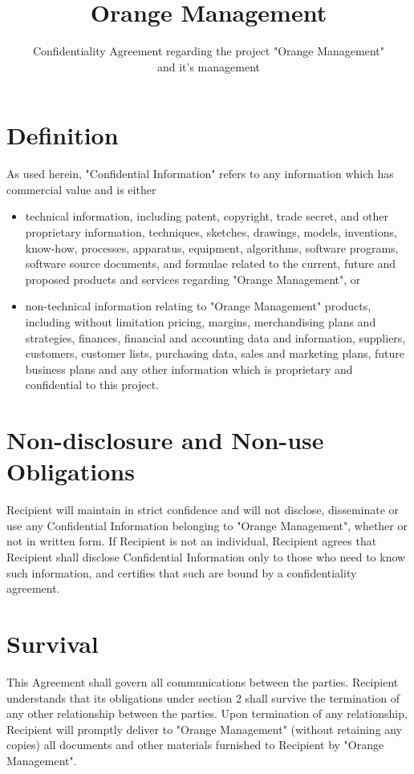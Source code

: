 \documentclass[a4paper]{article}
\title{Orange Management}
\author{Confidentiality Agreement regarding the project "Orange Management" \\ and it's management}
\date{}
\begin{document}
\maketitle

\section{Definition}
As used herein, "Confidential Information" refers to any information which has commercial value and is either

\begin{itemize}
\item technical information, including patent, copyright, trade secret, and other proprietary information, techniques, sketches, drawings, models, inventions, know-how, processes, apparatus, equipment, algorithms, software programs, software source documents, and formulae related to the current, future and proposed products and services regarding "Orange Management", or 
\item non-technical information relating to "Orange Management" products, including without limitation pricing, margins, merchandising plans and strategies, finances, financial and accounting data and information, suppliers, customers, customer lists, purchasing data, sales and marketing plans, future business plans and any other information which is proprietary and confidential to this project.
\end{itemize}

\section{Non-disclosure and Non-use Obligations}
Recipient will maintain in strict confidence and will not disclose, disseminate or use any Confidential Information belonging to "Orange Management", whether or not in written form. If Recipient is not an individual, Recipient agrees that Recipient shall disclose Confidential Information only to those who need to know such information, and certifies that such are bound by a confidentiality agreement.

\section{Survival}
This Agreement shall govern all communications between the parties. Recipient understands that its obligations under section 2 shall survive the termination of any other relationship between the parties. Upon termination of any relationship, Recipient will promptly deliver to "Orange Management" (without retaining any copies) all documents and other materials furnished to Recipient by "Orange Management".
\end{document}
